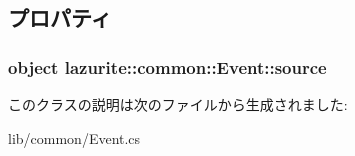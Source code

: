 \subsection{プロパティ}
\hypertarget{classlazurite_1_1common_1_1_event_a65acbd55d51fcff33a61adcfc225970a}{
\subsubsection[{source}]{\setlength{\rightskip}{0pt plus 5cm}object lazurite::common::Event::source}}
\label{classlazurite_1_1common_1_1_event_a65acbd55d51fcff33a61adcfc225970a}


このクラスの説明は次のファイルから生成されました:\begin{DoxyCompactItemize}
\item 
lib/common/Event.cs\end{DoxyCompactItemize}

